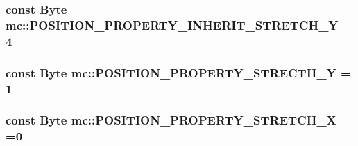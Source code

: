 \subsubsection[{\texorpdfstring{P\+O\+S\+I\+T\+I\+O\+N\+\_\+\+P\+R\+O\+P\+E\+R\+T\+Y\+\_\+\+I\+N\+H\+E\+R\+I\+T\+\_\+\+S\+T\+R\+E\+T\+C\+H\+\_\+Y}{POSITION_PROPERTY_INHERIT_STRETCH_Y}}]{\setlength{\rightskip}{0pt plus 5cm}const {\bf Byte} mc\+::\+P\+O\+S\+I\+T\+I\+O\+N\+\_\+\+P\+R\+O\+P\+E\+R\+T\+Y\+\_\+\+I\+N\+H\+E\+R\+I\+T\+\_\+\+S\+T\+R\+E\+T\+C\+H\+\_\+Y = 4}\hypertarget{namespacemc_a29d2f6b06f29e315be17e977d9a7eabb}{}\label{namespacemc_a29d2f6b06f29e315be17e977d9a7eabb}
\subsubsection[{\texorpdfstring{P\+O\+S\+I\+T\+I\+O\+N\+\_\+\+P\+R\+O\+P\+E\+R\+T\+Y\+\_\+\+S\+T\+R\+E\+C\+T\+H\+\_\+Y}{POSITION_PROPERTY_STRECTH_Y}}]{\setlength{\rightskip}{0pt plus 5cm}const {\bf Byte} mc\+::\+P\+O\+S\+I\+T\+I\+O\+N\+\_\+\+P\+R\+O\+P\+E\+R\+T\+Y\+\_\+\+S\+T\+R\+E\+C\+T\+H\+\_\+Y = 1}\hypertarget{namespacemc_a93b89015c5feaff1a86607a1bbe5b7b6}{}\label{namespacemc_a93b89015c5feaff1a86607a1bbe5b7b6}
\subsubsection[{\texorpdfstring{P\+O\+S\+I\+T\+I\+O\+N\+\_\+\+P\+R\+O\+P\+E\+R\+T\+Y\+\_\+\+S\+T\+R\+E\+T\+C\+H\+\_\+X}{POSITION_PROPERTY_STRETCH_X}}]{\setlength{\rightskip}{0pt plus 5cm}const {\bf Byte} mc\+::\+P\+O\+S\+I\+T\+I\+O\+N\+\_\+\+P\+R\+O\+P\+E\+R\+T\+Y\+\_\+\+S\+T\+R\+E\+T\+C\+H\+\_\+X =0}\hypertarget{namespacemc_a3f402a582017395627a94f19c99ae875}{}\label{namespacemc_a3f402a582017395627a94f19c99ae875}
